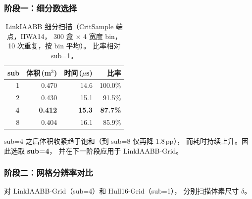 \documentclass[journal]{IEEEtran}
\begin{document}
\subsubsection{阶段一：细分数选择}

\begin{table}[ht]
\centering
\caption{LinkIAABB 细分扫描（CritSample 端点，IIWA14，
300 盒 $\times$ 4 宽度 bin，10 次重复，按 bin 平均）。
比率相对 sub=1。}
\label{tab:sub_sweep_zh}
\begin{tabular}{@{}rrrr@{}}
\toprule
\textbf{sub} & \textbf{体积\,(m$^{3}$)} & \textbf{时间\,($\mu$s)}
  & \textbf{比率} \\
\midrule
1 & 0.470 & 14.6 & 100.0\% \\
2 & 0.430 & 15.1 &  91.5\% \\
\textbf{4} & \textbf{0.412} & \textbf{15.3} & \textbf{87.7\%} \\
8 & 0.404 & 16.1 &  85.9\% \\
\bottomrule
\end{tabular}
\end{table}

sub=4 之后体积收紧趋于饱和（到 sub=8 仅再降 1.8\,pp），
而耗时持续上升。因此选取 \textbf{sub=4}，
并在下一阶段应用于 LinkIAABB-Grid。

\subsubsection{阶段二：网格分辨率对比}

对 LinkIAABB-Grid（sub=4）和 Hull16-Grid（sub=1），
分别扫描体素尺寸 $\delta$。
\end{document}
